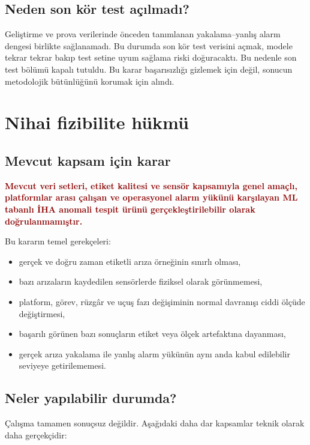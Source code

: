 \documentclass[11pt,a4paper]{article}
\newcommand{\resultno}[1]{\textcolor{darkred}{\textbf{#1}}}
\begin{document}
\subsection{Neden son kör test açılmadı?}

Geliştirme ve prova verilerinde önceden tanımlanan yakalama--yanlış alarm dengesi
birlikte sağlanamadı. Bu durumda son kör test verisini açmak, modele tekrar tekrar
bakıp test setine uyum sağlama riski doğuracaktı. Bu nedenle son test bölümü
kapalı tutuldu. Bu karar başarısızlığı gizlemek için değil, sonucun metodolojik
bütünlüğünü korumak için alındı.

\section{Nihai fizibilite hükmü}

\subsection{Mevcut kapsam için karar}

\resultno{Mevcut veri setleri, etiket kalitesi ve sensör kapsamıyla genel amaçlı,
platformlar arası çalışan ve operasyonel alarm yükünü karşılayan ML tabanlı İHA
anomali tespit ürünü gerçekleştirilebilir olarak doğrulanmamıştır.}

Bu kararın temel gerekçeleri:

\begin{itemize}
  \item gerçek ve doğru zaman etiketli arıza örneğinin sınırlı olması,
  \item bazı arızaların kaydedilen sensörlerde fiziksel olarak görünmemesi,
  \item platform, görev, rüzgâr ve uçuş fazı değişiminin normal davranışı
  ciddi ölçüde değiştirmesi,
  \item başarılı görünen bazı sonuçların etiket veya ölçek artefaktına dayanması,
  \item gerçek arıza yakalama ile yanlış alarm yükünün aynı anda kabul edilebilir
  seviyeye getirilememesi.
\end{itemize}

\subsection{Neler yapılabilir durumda?}

Çalışma tamamen sonuçsuz değildir. Aşağıdaki daha dar kapsamlar teknik olarak
daha gerçekçidir:
\end{document}

